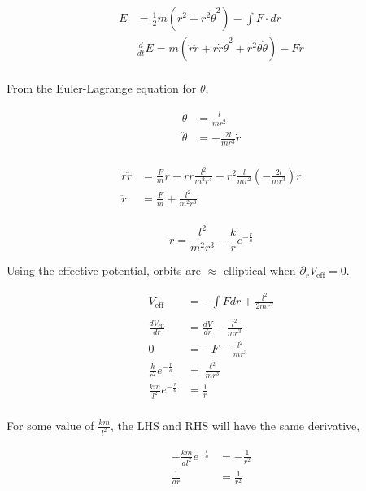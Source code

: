 \documentclass{article}
\begin{document}
\begin{align*}
    E&=\frac{1}{2} m\left(r^{2}+r^{2} \dot{\theta}^{2}\right)-\int F \cdot d r\\
     &\frac{d}{d t} E=m\left(\ddot{r} \ddot{r}+r \dot{r} \dot{\theta}^{2}+r^{2} \dot{\theta} \ddot{\theta}\right)-F \dot{r}\\
\end{align*}

From the Euler-Lagrange equation for $\theta$, 

\begin{align*}
    \dot \theta &= \frac{l}{m r^2}\\
    \ddot \theta &= -\frac{2l}{m r^3}\dot r\\
\end{align*}

\begin{align*}
    \dot{r} \ddot{r}&=\frac{F}{m} \dot{r}-r \dot{r} \frac{l^{2}}{m^{2} r^{4}}-r^2 \frac{l}{m r^{2}}\left(-\frac{2 l}{m r^{3}}\right) \dot{r}\\
    \ddot{r}&=\frac{F}{m}+\frac{l^{2}}{m^{2} r^{3}}\\
\end{align*}


$$\boxed{\ddot{r}=\frac{l^{2}}{m^{2} r^{3}}-\frac{k}{r} e^{-\frac{r}{a}}}$$

Using the effective potential, orbits are $\approx$ elliptical when $\partial_r V_\mathrm{eff} = 0$.

\begin{align*}
    V_{\text {eff }}&=-\int F d r+\frac{l^{2}}{2 m r^{2}}\\
    &\\
    \frac{d V_\mathrm{eff}}{d r}&=\frac{d V}{d r}-\frac{l^{2}}{m r^{3}}\\
    0&=-F-\frac{l^{2}}{m r^{3}}\\
    \frac{k}{r^{2}} e^{-\frac{r}{a}}& =\frac{\ell^{2}}{m r^{3}}\\
    \frac{k m}{l^{2}} e^{-\frac{r}{a}}& =\frac{1}{r}\\
\end{align*}

For some value of $\frac{k m}{l^{2}}$, the LHS and RHS will have the same derivative, 

\begin{align*}
    -\frac{k m}{a l^{2}} e^{-\frac{r}{a}}&=-\frac{1}{r^{2}}\\
    \frac{1}{a r}&=\frac{1}{r^{2}}\\
\end{align*}
\end{document}
